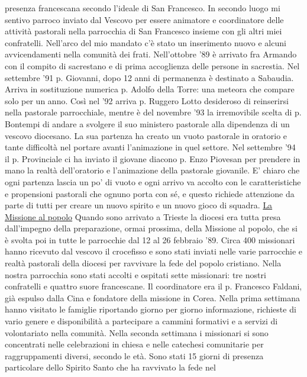 presenza francescana secondo l'ideale di San Francesco. In secondo luogo mi sentivo parroco 
inviato dal Vescovo per essere animatore e coordinatore delle attività pastorali nella parrocchia di 
San Francesco insieme con gli altri miei confratelli.
Nell'arco del mio mandato c'è stato un inserimento nuovo e alcuni avvicendamenti nella 
comunità dei frati. Nell'ottobre '89 è arrivato fra Armando con il compito di sacrestano e di prima 
accoglienza delle persone in sacrestia. Nel settembre '91 p. Giovanni, dopo 12 anni di permanenza è 
destinato a Sabaudia. Arriva in sostituzione numerica p. Adolfo della Torre: una meteora che 
compare solo per un anno. Così nel '92 arriva p. Ruggero Lotto desideroso di reinserirsi nella 
pastorale parrocchiale, mentre  è del novembre '93 la irremovibile scelta di p. Bontempi di andare a 
svolgere il suo ministero pastorale alla dipendenza di un vescovo diocesano. La sua partenza ha 
creato un vuoto pastorale in oratorio e tante difficoltà nel portare avanti l'animazione in quel settore. 
Nel settembre '94 il p. Provinciale ci ha inviato il giovane diacono p. Enzo Piovesan per prendere in 
mano la realtà dell'oratorio e l'animazione della pastorale giovanile. 
E' chiaro che ogni partenza lascia un po' di vuoto e ogni arrivo va accolto con le caratteristiche e 
propensioni pastorali che ognuno porta con sé, e questo richiede attenzione da parte di tutti per 
creare un nuovo spirito e un nuovo gioco di squadra.
\bigbreak
{}
\underline{La Missione al popolo}
\medbreak
Quando sono arrivato a Trieste la diocesi era tutta presa dall'impegno della preparazione, 
ormai prossima, della Missione al popolo, che si è svolta poi in tutte le parrocchie dal 12 al 26 
febbraio '89.
Circa 400 missionari hanno ricevuto dal vescovo il crocefisso e sono stati inviati nelle varie 
parrocchie e realtà pastorali della diocesi per ravvivare la fede del popolo cristiano. Nella nostra 
parrocchia sono stati accolti e ospitati sette missionari: tre nostri confratelli e quattro suore 
francescane. Il coordinatore era il p. Francesco Faldani, già espulso dalla Cina e fondatore della 
missione in Corea. Nella prima settimana hanno visitato le famiglie riportando giorno per giorno 
informazione, richieste di vario genere e disponibilità a partecipare a cammini formativi e a servizi 
di volontariato nella comunità. Nella seconda settimana i missionari si sono concentrati nelle 
celebrazioni in chiesa e nelle catechesi comunitarie per raggruppamenti diversi, secondo le età.
Sono stati 15 giorni di presenza particolare dello Spirito Santo che ha ravvivato la fede nel 
